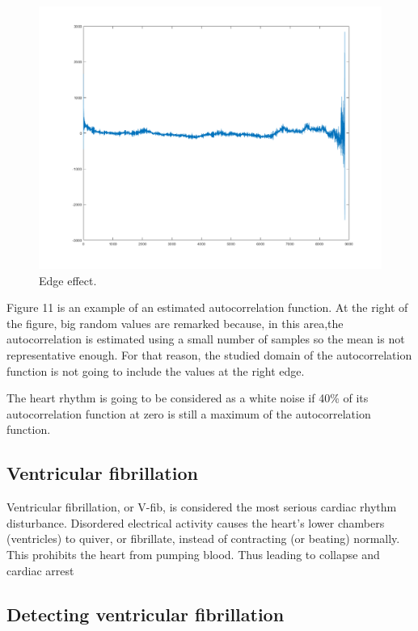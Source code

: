\documentclass{article}
\begin{document}
\begin{figure}
\centerline{\includegraphics[scale=0.4]{figure_6_edge_effect.png}}
\caption{Edge effect.}
\end{figure}

Figure 11 is an example of an estimated autocorrelation function. At the right of the figure, big random values are remarked because, in this area,the autocorrelation is estimated using a small number of samples so the mean is not representative enough. For that reason, the studied domain of the autocorrelation function is not going to include the values at the right edge.

The heart rhythm is going to be considered as a white noise if 40\% of its autocorrelation function at zero is still a maximum of the autocorrelation function.

\subsection{Ventricular fibrillation}

Ventricular fibrillation, or V-fib, is considered the most serious cardiac rhythm disturbance.
Disordered electrical activity causes the heart’s lower chambers (ventricles) to quiver, or fibrillate, instead of contracting (or beating) normally. This prohibits the heart from pumping blood. Thus leading to collapse and cardiac arrest

\subsection{Detecting ventricular fibrillation}
\end{document}
